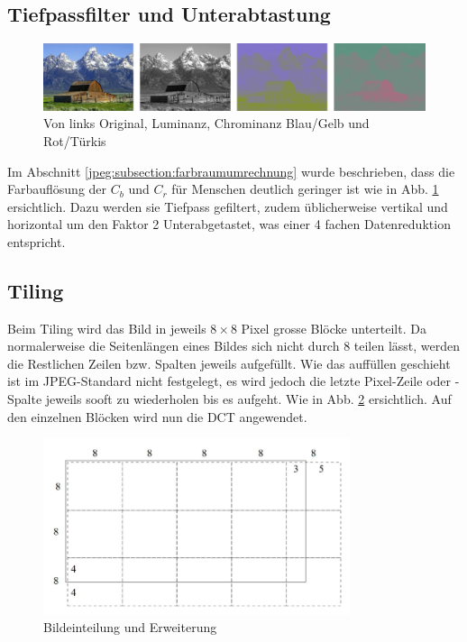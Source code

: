 \subsection{Tiefpassfilter und Unterabtastung
\label{jpeg:subsection:tiefpass}}

\begin{figure}
    \centering
    \includegraphics[width=\linewidth]{papers/jpeg/pictures/ycbcr.pdf}
    \caption{Von links Original, Luminanz, Chrominanz Blau/Gelb und Rot/Türkis
        \label{jpeg:fig:ycbcr}}
\end{figure}

Im Abschnitt \ref{jpeg:subsection:farbraumumrechnung} wurde beschrieben, dass die Farbauflösung der \(C_b\) und \(C_r\) für Menschen deutlich geringer ist wie in Abb. \ref{jpeg:fig:ycbcr} ersichtlich.
Dazu werden sie Tiefpass gefiltert, zudem üblicherweise vertikal und horizontal um den Faktor 2 Unterabgetastet, was einer 4 fachen Datenreduktion entspricht.

\subsection{Tiling
\label{jpeg:subsection:tiling}}
Beim Tiling wird das Bild in jeweils \(8\times8\) Pixel grosse Blöcke unterteilt.
Da normalerweise die Seitenlängen eines Bildes sich nicht durch 8 teilen lässt, werden die Restlichen Zeilen bzw. Spalten jeweils aufgefüllt.
Wie das auffüllen geschieht ist im JPEG-Standard nicht festgelegt, es wird jedoch die letzte Pixel-Zeile oder -Spalte jeweils sooft zu wiederholen bis es aufgeht.
Wie in Abb. \ref{jpeg:fig:tiling} ersichtlich.
Auf den einzelnen Blöcken wird nun die DCT angewendet.

\begin{figure}
    \centering
    \includegraphics[width=90mm]{papers/jpeg/pictures/unterteilung.pdf}
    \caption{Bildeinteilung und Erweiterung
        \label{jpeg:fig:tiling}}
\end{figure}


